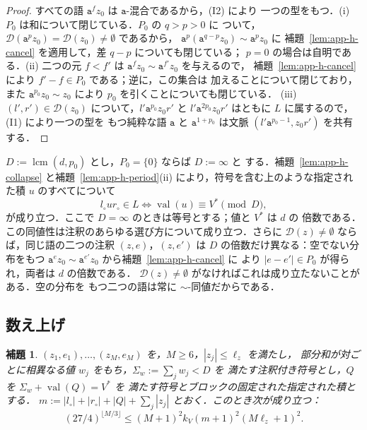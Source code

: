 \documentclass[11pt,a4paper]{ltjsarticle}
\numberwithin{equation}{section}
\theoremstyle{plain}
\newtheorem{lemma}[theorem]{補題}
\theoremstyle{definition}
\theoremstyle{remark}
\theoremstyle{plain}
\newcommand{\D}{\mathcal{D}}
\begin{document}
\begin{proof}
すべての語 $\mathtt a^fz_0$ は $\mathtt a$-混合であるから，(I2) により
一つの型をもつ．(i) $P_0$ は和について閉じている．$P_0$ の $q>p>0$ に
ついて，$\D(\mathtt a^pz_0)=\D(z_0)\ne\emptyset$ であるから，
$\mathtt a^p(\mathtt a^{q-p}z_0)\sim\mathtt a^pz_0$ に
補題~\ref{lem:app-h-cancel} を適用して，差 $q-p$ についても閉じている；
$p=0$ の場合は自明である．(ii) 二つの元 $f<f'$ は
$\mathtt a^fz_0\sim\mathtt a^{f'}z_0$ を与えるので，
補題~\ref{lem:app-h-cancel} により $f'-f\in P_0$ である；逆に，この集合は
加えることについて閉じており，また
$\mathtt a^{p_0}z_0\sim z_0$ により $p_0$ を引くことについても閉じている．
(iii) $(l',r')\in\D(z_0)$ について，$l'\mathtt a^{p_0}z_0r'$ と
$l'\mathtt a^{2p_0}z_0r'$ はともに $L$ に属するので，(I1) により一つの型を
もつ純粋な語 $\mathtt a$ と $\mathtt a^{1+p_0}$ は文脈
$(l'\mathtt a^{p_0-1},z_0r')$ を共有する．
\end{proof}

$D:=\operatorname{lcm}(d,p_0)$ とし，$P_0=\{0\}$ ならば $D:=\infty$ と
する．補題~\ref{lem:app-h-collapse} と補題~\ref{lem:app-h-period}(ii)
により，符号を含む上のような指定された積 $u$ のすべてについて
\begin{equation}
\label{eq:app-h-member}
 l_\circ ur_\circ\in L\iff\operatorname{val}(u)\equiv V^*\pmod D,
\end{equation}
が成り立つ．ここで $D=\infty$ のときは等号とする；値と $V^*$ は $d$ の
倍数である．この同値性は注釈のあらゆる選び方について成り立つ．さらに
$\D(z)\ne\emptyset$ ならば，同じ語の二つの注釈 $(z,e)$，$(z,e')$ は
$D$ の倍数だけ異なる：空でない分布をもつ
$\mathtt a^ez_0\sim\mathtt a^{e'}z_0$ から補題~\ref{lem:app-h-cancel} に
より $|e-e'|\in P_0$ が得られ，両者は $d$ の倍数である．
$\D(z)\ne\emptyset$ がなければこれは成り立たないことがある．空の分布を
もつ二つの語は常に $\sim$-同値だからである．

\subsection{数え上げ}

\begin{lemma}
\label{lem:app-h-count}
$(z_1,e_1),\ldots,(z_M,e_M)$ を，$M\ge6$，$|z_j|\le\ell_z$ を満たし，
部分和が対ごとに相異なる値 $w_j$ をもち，$\Sigma_w:=\sum_jw_j<D$ を
満たす注釈付き符号とし，$Q$ を $\Sigma_w+\operatorname{val}(Q)=V^*$ を
満たす符号とブロックの固定された指定された積とする．
$m:=|l_\circ|+|r_\circ|+|Q|+\sum_j|z_j|$ とおく．このとき次が成り立つ：
\[
 (27/4)^{\lfloor M/3\rfloor}\le(M+1)^2k_V(m+1)^2(M\ell_z+1)^2.
\]
\end{lemma}
\end{document}
